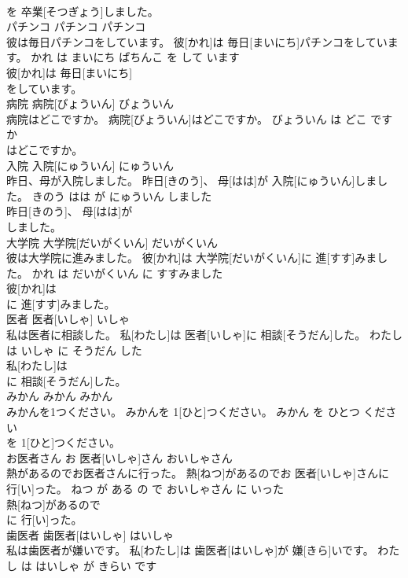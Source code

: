 \documentclass[8pt]{extreport}
\begin{document}
\begin{CJK}{UTF8}{min}
\\	を 卒業[そつぎょう]しました。		
\\	パチンコ	パチンコ	パチンコ	
\\	彼は毎日パチンコをしています。	彼[かれ]は 毎日[まいにち]パチンコをしています。	かれ は まいにち ぱちんこ を して います	
\\	彼[かれ]は 毎日[まいにち]
\\	をしています。		
\\	病院	病院[びょういん]	びょういん	
\\	病院はどこですか。	病院[びょういん]はどこですか。	びょういん は どこ です か	
\\	はどこですか。		
\\	入院	入院[にゅういん]	にゅういん	
\\	昨日、母が入院しました。	昨日[きのう]、 母[はは]が 入院[にゅういん]しました。	きのう はは が にゅういん しました	
\\	昨日[きのう]、 母[はは]が
\\	しました。		
\\	大学院	大学院[だいがくいん]	だいがくいん	
\\	彼は大学院に進みました。	彼[かれ]は 大学院[だいがくいん]に 進[すす]みました。	かれ は だいがくいん に すすみました	
\\	彼[かれ]は
\\	に 進[すす]みました。		
\\	医者	医者[いしゃ]	いしゃ	
\\	私は医者に相談した。	私[わたし]は 医者[いしゃ]に 相談[そうだん]した。	わたし は いしゃ に そうだん した	
\\	私[わたし]は
\\	に 相談[そうだん]した。		
\\	みかん	みかん	みかん	
\\	みかんを1つください。	みかんを 1[ひと]つください。	みかん を ひとつ ください	
\\	を 1[ひと]つください。		
\\	お医者さん	お 医者[いしゃ]さん	おいしゃさん	
\\	熱があるのでお医者さんに行った。	熱[ねつ]があるのでお 医者[いしゃ]さんに 行[い]った。	ねつ が ある の で おいしゃさん に いった	
\\	熱[ねつ]があるので
\\	に 行[い]った。		
\\	歯医者	歯医者[はいしゃ]	はいしゃ	
\\	私は歯医者が嫌いです。	私[わたし]は 歯医者[はいしゃ]が 嫌[きら]いです。	わたし は はいしゃ が きらい です	

\end{CJK}
\end{document}

